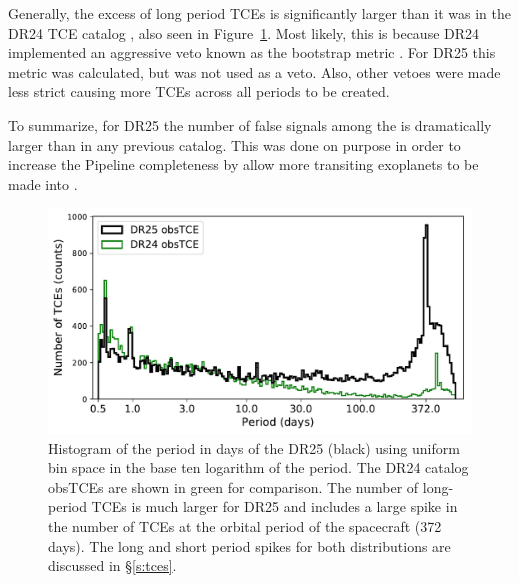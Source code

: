 Generally, the excess of long period TCEs is significantly larger than it was in the DR24 TCE catalog \citep{Seader2015}, also seen in Figure~\ref{f:obstces}. Most likely, this is because DR24 implemented an aggressive veto known as the bootstrap metric \citep{Seader2015}.  For DR25 this metric was calculated, but was not used as a veto. Also, other vetoes were made less strict causing more TCEs across all periods to be created. 

To summarize, for DR25 the number of false signals among the  is dramatically larger than in any previous catalog. This was done on purpose in order to increase the Pipeline completeness by allow more transiting exoplanets to be made into . 

\begin{figure}[htb]
 \begin{center}
  \includegraphics[width=\linewidth]{f1.pdf}
  \caption{Histogram of the period in days of the DR25  (black) using uniform bin space in the base ten logarithm of the period. The DR24 catalog obsTCEs \citep{Seader2015} are shown in green for comparison. The number of long-period TCEs is much larger for DR25 and includes a large spike in the number of TCEs at the orbital period of the spacecraft (372 days). The long and short period spikes for both distributions are discussed in \S\ref{s:tces}.}
  \label{f:obstces} 
 \end{center}
 \end{figure}



